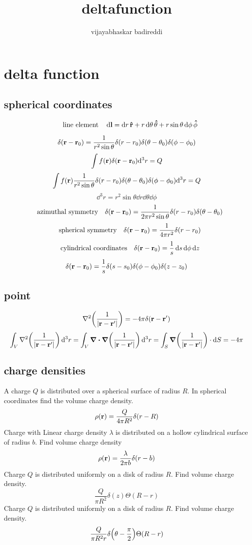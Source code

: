 \documentclass[12pt]{article}
\title{deltafunction}
\author{vijayabhaskar badireddi}
\date{}
\begin{document}
\section*{delta function}
\subsection*{spherical coordinates}
\[\qq{line element}\dd{\vb{l}}=\dd{r}\vu{r}+r\dd{\theta}\vu{\theta}+r\sin\theta\dd{\phi}\vu{\phi}\]

\[\delta(\vb{r}-\vb{r}_0)=\frac{1}{r^2\sin\theta}\delta(r-r_0)\delta(\theta-\theta_0)\delta(\phi-\phi_0)\]
\[\int f(\vb{r})\delta(\vb{r}-\vb{r}_0)\dd^3{r}=Q\]
\[\int f(\vb{r})\frac{1}{r^2\sin\theta}\delta(r-r_0)\delta(\theta-\theta_0)\delta(\phi-\phi_0)\dd^3{r}=Q\]
\[\dd^3{r}=r^2\sin\theta\dd{r}\dd{\theta}\dd{\phi}\]
\[\qq{azimuthal symmetry} \delta(\vb{r}-\vb{r}_0)=\frac{1}{2\pi r^2\sin\theta}\delta(r-r_0)\delta(\theta-\theta_0)\]
\[\qq{spherical symmetry} \delta(\vb{r}-\vb{r}_0)=\frac{1}{4\pi r^2}\delta(r-r_0)\]
\[\qq{cylindrical coordinates}\delta(\vb{r}-\vb{r}_0)=\frac{1}{s}\dd{s}\dd{\phi}\dd{z}\]
\[\delta(\vb{r}-\vb{r}_0)=\frac{1}{s}\delta{(s-s_0)}\delta{(\phi-\phi_0)}\delta{(z-z_0)}\]
\subsection*{point }
\[\laplacian\qty(\frac{1}{|\vb{r}-\vb{r}'|})=-4\pi\delta(\vb{r}-\vb{r}')\]
\[\int_V\laplacian\qty(\frac{1}{|\vb{r}-\vb{r}'|})\dd[3]{r}=\int_V\div\grad\qty(\frac{1}{|\vb{r}-\vb{r}'|})\dd[3]{r}=\int_S\grad\qty(\frac{1}{|\vb{r}-\vb{r}'|})\cdot\dd{S}=-4\pi\]
\subsection*{charge densities}
A charge $Q$ is distributed over a spherical surface of radius $R$. In spherical coordinates find the volume charge density.
\[\rho(\vb{r})=\frac{Q}{4\pi R^2}\delta(r-R)\] 
Charge with Linear charge density $\lambda$ is distributed on a hollow cylindrical surface of radius $b$. Find volume charge density \[\rho(\vb{r})=\frac{\lambda}{2\pi b}\delta(r-b)\]
Charge $Q$ is distributed uniformly on a disk of radius $R$. Find volume charge density.\[\frac{Q}{\pi R^2}\delta(z)\Theta(R-r)\]
Charge $Q$ is distributed uniformly on a disk of radius $R$. Find volume charge density.\[\frac{Q}{\pi R^2r}\delta\qty(\theta-\frac{\pi}{2})\Theta(R-r)\]
\end{document}
